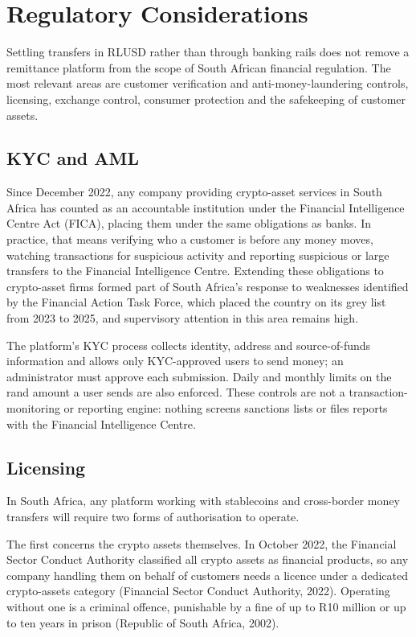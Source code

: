 \documentclass[11pt,a4paper]{article}
\begin{document}
\section{Regulatory Considerations}\label{sec:regulatory}

Settling transfers in RLUSD rather than through banking rails does not remove a remittance platform from the scope of South African financial regulation. The most relevant areas are customer verification and anti-money-laundering controls, licensing, exchange control, consumer protection and the safekeeping of customer assets.

\subsection{KYC and AML}
Since December 2022, any company providing crypto-asset services in South Africa has counted as an accountable institution under the Financial Intelligence Centre Act (FICA), placing them under the same obligations as banks. In practice, that means verifying who a customer is before any money moves, watching transactions for suspicious activity and reporting suspicious or large transfers to the Financial Intelligence Centre. Extending these obligations to crypto-asset firms formed part of South Africa's response to weaknesses identified by the Financial Action Task Force, which placed the country on its grey list from 2023 to 2025, and supervisory attention in this area remains high.

The platform's KYC process collects identity, address and source-of-funds information and allows only KYC-approved users to send money; an administrator must approve each submission. Daily and monthly limits on the rand amount a user sends are also enforced. These controls are not a transaction-monitoring or reporting engine: nothing screens sanctions lists or files reports with the Financial Intelligence Centre.

\subsection{Licensing}
In South Africa, any platform working with stablecoins and cross-border money transfers will require two forms of authorisation to operate.

The first concerns the crypto assets themselves. In October 2022, the Financial Sector Conduct Authority classified all crypto assets as financial products, so any company handling them on behalf of customers needs a licence under a dedicated crypto-assets category (Financial Sector Conduct Authority, 2022). Operating without one is a criminal offence, punishable by a fine of up to R10 million or up to ten years in prison (Republic of South Africa, 2002).
\end{document}
